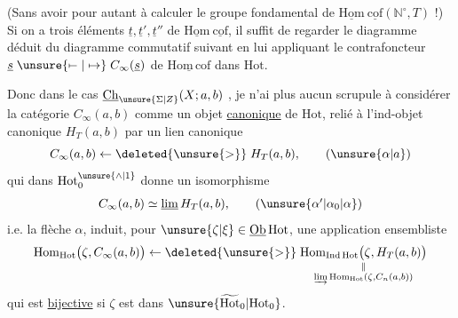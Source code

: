 (Sans avoir pour autant à calculer le groupe fondamental de $\underline{\mathrm{Hom}}\ \underline{\mathrm{cof}}(\mathbb N^\circ,T)$ !) Si on a trois éléments $\underline t,\underline t',\underline t''$ de $\underline{\mathrm{Hom}}\ \underline{\mathrm{cof}}$, il suffit de regarder le diagramme déduit du diagramme commutatif suivant
en lui appliquant le contrafoncteur $\underline s\mathrel{\unsure{\mapstochar\relbar|\mapsto}}C_\infty(\underline s)$ de $\underline{\mathrm{Hom\,cof}}$ dans $\mathrm{Hot}$.

Donc dans le cas  $\underline{\mathrm{Ch}}_{\unsure{\Sigma|Z}}(X;a,b)$ , je n'ai plus aucun scrupule à considérer la catégorie $C_\infty(a,b)$ comme un objet \uline{canonique} de $\mathrm{Hot}$, relié à  l'ind-objet canonique $H_T(a,b)$  par un lien canonique
\[
C_\infty(a,b)\mathrel{\leftarrow\deleted{\unsure{>}}}H_T(a,b),
\tag*{$(\unsure{\alpha|a})$}
\]
qui dans $\mathrm{Hot}_0^{\unsure{\wedge|1}}$ donne un isomorphisme
\[
C_\infty(a,b)\simeq\underline{\lim}\,H_T(a,b),
\tag*{$(\unsure{\alpha'|\alpha_0|\alpha})$}
\]
i.e. la flèche $\alpha$, induit, pour $\unsure{\zeta|\xi}\in\underline{\mathrm{Ob}}\,\mathrm{Hot}$, une application ensembliste
\[
\mathrm{Hom}_{\mathrm{Hot}}\bigl(\zeta,C_\infty(a,b)\bigr)
\mathrel{\leftarrow\deleted{\unsure{>}}}
\underset{\substack{\Vert\\
\underrightarrow{\lim}\,\mathrm{Hom}_{\mathrm{Hot}}(\zeta,C_n(a,b))}}
{\mathrm{Hom}_{\mathrm{Ind\,Hot}}\bigl(\zeta,H_T(a,b)\bigr)}
\]
qui est \uline{bijective} si $\zeta$ est dans $\unsure{\widetilde{\mathrm{Hot}}_0|\mathrm{Hot}_0}$.
